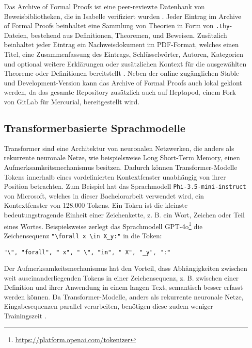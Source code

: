 \documentclass[12pt,letterpaper]{article} %
\begin{document}
Das Archive of Formal Proofs ist eine peer-reviewte Datenbank von Beweisbibliotheken, die in Isabelle verifiziert wurden \citep[S. 1]{blanchette_mining_2015} \citep[S. 1]{mackenzie_re-imagining_2022}.
Jeder Eintrag im Archive of Formal Proofs beinhaltet eine Sammlung von Theorien in Form von \texttt{.thy}-Dateien, bestehend aus Definitionen, Theoremen, und Beweisen.
Zusätzlich beinhaltet jeder Eintrag ein Nachweisdokument im PDF-Format, welches einen Titel, eine Zusammenfassung des Eintrags, Schlüsselwörter, Autoren, Kategorien und optional weitere Erklärungen oder zusätzlichen Kontext für die ausgewählten Theoreme oder Definitionen bereitstellt \citep[S. 1]{blanchette_mining_2015}.
Neben der online zugänglichen Stable- und Development-Version kann das Archive of Formal Proofs auch lokal geklont werden, da das gesamte Repository zusätzlich auch auf Heptapod, einem Fork von GitLab für Mercurial, bereitgestellt wird.

\subsection{Transformerbasierte Sprachmodelle}

Transformer sind eine Architektur von neuronalen Netzwerken, die anders als rekurrente neuronale Netze, wie beispielsweise Long Short-Term Memory, einen Aufmerksamkeitsmechanismus besitzen.
Dadurch können Transformer-Modelle Tokens innerhalb eines vordefinierten Kontextfenster unabhängig von ihrer Position betrachten.
Zum Beispiel hat das Sprachmodell \texttt{Phi-3.5-mini-\allowbreak instruct} von Microsoft, welches in dieser Bachelorarbeit verwendet wird, ein Kontextfenster von 128.000 Tokens.
Ein Token ist die kleinste bedeutungstragende Einheit einer Zeichenkette, z. B. ein Wort, Zeichen oder Teil eines Wortes.
Beispielsweise zerlegt das Sprachmodell GPT-4o\footnote{\url{https://platform.openai.com/tokenizer}} die Zeichensequenz \texttt{"\textbackslash forall x \textbackslash in X\_y:"} in die Token:
\begin{verbatim}
"\", "forall", " x", " \", "in", " X", "_y", ":"
\end{verbatim}

Der Aufmerksamkeitsmechanismus hat den Vorteil, dass Abhängigkeiten zwischen weit auseinanderliegenden Tokens in einer Zeichensequenz, z. B. zwischen einer Definition und ihrer Anwendung in einem langen Text, semantisch besser erfasst werden können.
Da Transformer-Modelle, anders als rekurrente neuronale Netze, Eingabesequenzen parallel verarbeiten, benötigen diese zudem weniger Trainingszeit \citep{vaswani_attention_2023}.
\end{document}
